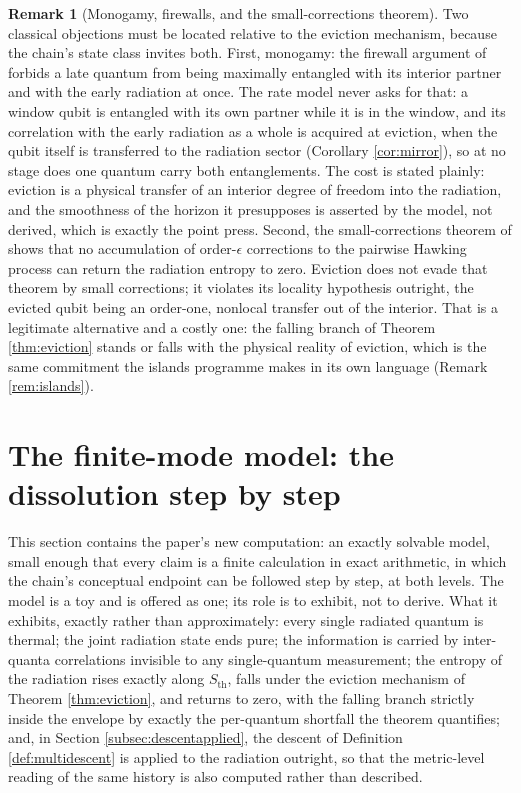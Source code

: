 \documentclass[11pt]{article}
\theoremstyle{definition}
\newtheorem{remark}[theorem]{Remark}
\newcommand{\Sth}{S_{\mathrm{th}}}
\begin{document}
\begin{remark}[Monogamy, firewalls, and the small-corrections theorem]\label{rem:monogamy}
Two classical objections must be located relative to the eviction mechanism, because the chain's state class invites both. First, monogamy: the firewall argument of \cite{AMPS2013} forbids a late quantum from being maximally entangled with its interior partner and with the early radiation at once. The rate model never asks for that: a window qubit is entangled with its own partner while it is in the window, and its correlation with the early radiation as a whole is acquired at eviction, when the qubit itself is transferred to the radiation sector (Corollary \ref{cor:mirror}), so at no stage does one quantum carry both entanglements. The cost is stated plainly: eviction is a physical transfer of an interior degree of freedom into the radiation, and the smoothness of the horizon it presupposes is asserted by the model, not derived, which is exactly the point \cite{AMPS2013} press. Second, the small-corrections theorem of \cite{Mathur2009} shows that no accumulation of order-$\epsilon$ corrections to the pairwise Hawking process can return the radiation entropy to zero. Eviction does not evade that theorem by small corrections; it violates its locality hypothesis outright, the evicted qubit being an order-one, nonlocal transfer out of the interior. That is a legitimate alternative and a costly one: the falling branch of Theorem \ref{thm:eviction} stands or falls with the physical reality of eviction, which is the same commitment the islands programme makes in its own language (Remark \ref{rem:islands}).
\end{remark}

\section{The finite-mode model: the dissolution step by step}\label{sec:model}

This section contains the paper's new computation: an exactly solvable model, small enough that every claim is a finite calculation in exact arithmetic, in which the chain's conceptual endpoint can be followed step by step, at both levels. The model is a toy and is offered as one; its role is to exhibit, not to derive. What it exhibits, exactly rather than approximately: every single radiated quantum is thermal; the joint radiation state ends pure; the information is carried by inter-quanta correlations invisible to any single-quantum measurement; the entropy of the radiation rises exactly along $\Sth$, falls under the eviction mechanism of Theorem \ref{thm:eviction}, and returns to zero, with the falling branch strictly inside the envelope by exactly the per-quantum shortfall the theorem quantifies; and, in Section \ref{subsec:descentapplied}, the descent of Definition \ref{def:multidescent} is applied to the radiation outright, so that the metric-level reading of the same history is also computed rather than described.
\end{document}
